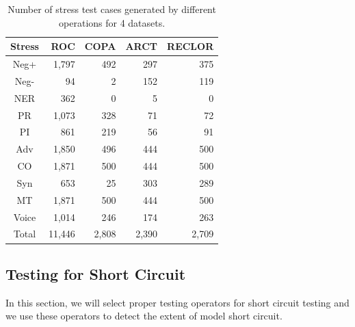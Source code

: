 \begin{table}[th]
\centering
\scriptsize
\begin{tabular}{c|rrrr}
\toprule
\textbf{Stress} & \textbf{ROC} & \textbf{COPA} & \textbf{ARCT} & \textbf{RECLOR} \\ \midrule
Neg+  &	1,797&492&	297&375	\\ \hline
Neg-  &	94&	2&	152&	119\\ \hline
NER  &	362&	0&	5&0	\\ \hline
PR  &	1,073&	328&71&72	\\ \hline
PI  &	     861&	219&	56&	91\\ \midrule
Adv  &	1,850&496	&444	&500	\\ \hline
CO  &	1,871&500	&444	&500	\\ \hline
Syn&	653&	 25&	303&289	\\ \midrule
MT  &	1,871&500	&444	&500	\\ \hline
Voice  &	1,014&246	&174	&263	\\ \hline
Total & 11,446  &  2,808 & 2,390 & 2,709 \\ \bottomrule
\end{tabular}
\caption{Number of stress test cases \protect\footnotemark generated
by different operations for 4 datasets.}
\label{tab:cases}
\end{table}


\subsection{Testing for Short Circuit}
\label{sec:short_circuit}
In this section, we will select proper testing operators for short circuit testing and 
we use these operators to detect the extent of model short circuit.

